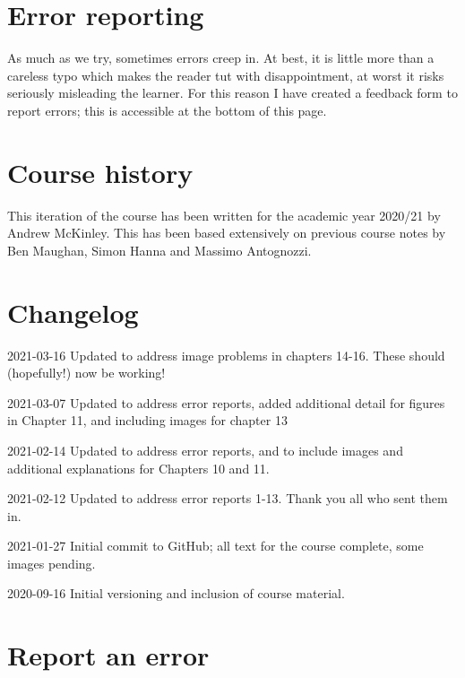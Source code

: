 \documentclass[
]{book}
\begin{document}
\hypertarget{error-reporting}{%
\section*{Error reporting}\label{error-reporting}}

As much as we try, sometimes errors creep in. At best, it is little more than a careless typo which makes the reader tut with disappointment, at worst it risks seriously misleading the learner. For this reason I have created a feedback form to report errors; this is accessible at the bottom of this page.

\hypertarget{course-history}{%
\section*{Course history}\label{course-history}}

This iteration of the course has been written for the academic year 2020/21 by Andrew McKinley. This has been based extensively on previous course notes by Ben Maughan, Simon Hanna and Massimo Antognozzi.

\hypertarget{sec:changelog}{%
\section*{Changelog}\label{sec:changelog}}

2021-03-16 Updated to address image problems in chapters 14-16. These should (hopefully!) now be working!

2021-03-07 Updated to address error reports, added additional detail for figures in Chapter 11, and including images for chapter 13

2021-02-14 Updated to address error reports, and to include images and additional explanations for Chapters 10 and 11.

2021-02-12 Updated to address error reports 1-13. Thank you all who sent them in.

2021-01-27 Initial commit to GitHub; all text for the course complete, some images pending.

2020-09-16 Initial versioning and inclusion of course material.

\hypertarget{report-an-error}{%
\section*{Report an error}\label{report-an-error}}
\end{document}
